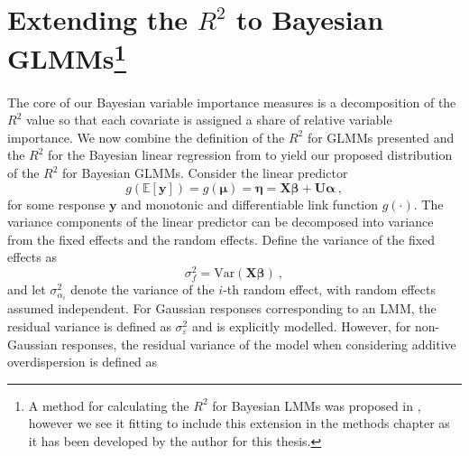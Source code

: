 
\section{Extending the $R^2$ to Bayesian GLMMs\protect\footnote{A method for calculating the $R^2$ for Bayesian LMMs was proposed in \citet[Chapter 2]{Arnstad}, however we see it fitting to include this extension in the methods chapter as it has been developed by the author for this thesis.}}
\label{sec:R2_Bayes_GLMM}
The core of our Bayesian variable importance measures is a decomposition of the $R^2$ value so that each covariate is assigned a share of relative variable importance. We now combine the definition of the $R^2$ for GLMMs presented  and the $R^2$ for the Bayesian linear regression from  to yield our proposed distribution of the $R^2$ for Bayesian GLMMs. Consider the linear predictor 
\begin{equation}
    g(\mathbb{E}[\mathbf{y}]) = g(\boldsymbol{\mu}) = \boldsymbol{\eta} = \mathbf{X}\boldsymbol{\beta} + \mathbf{U}\boldsymbol{\alpha} \ ,
\end{equation} 
for some response $\mathbf{y}$ and monotonic and differentiable link function $g(\cdot)$. 
The variance components of the linear predictor can be decomposed into variance from the fixed effects and the random effects. Define the variance of the fixed effects as 
\begin{equation}
    \sigma_{f}^2 = \text{Var}(\mathbf{X}\boldsymbol{\beta}) \ ,
\end{equation}
and let $\sigma^2_{\alpha_i}$ denote the variance of the $i$-th random effect, with random effects assumed independent. For Gaussian responses corresponding to an LMM, the residual variance is defined as $\sigma^2_{\varepsilon}$ and is explicitly modelled. However, for non-Gaussian responses, the residual variance of the model when considering additive overdispersion is defined as
